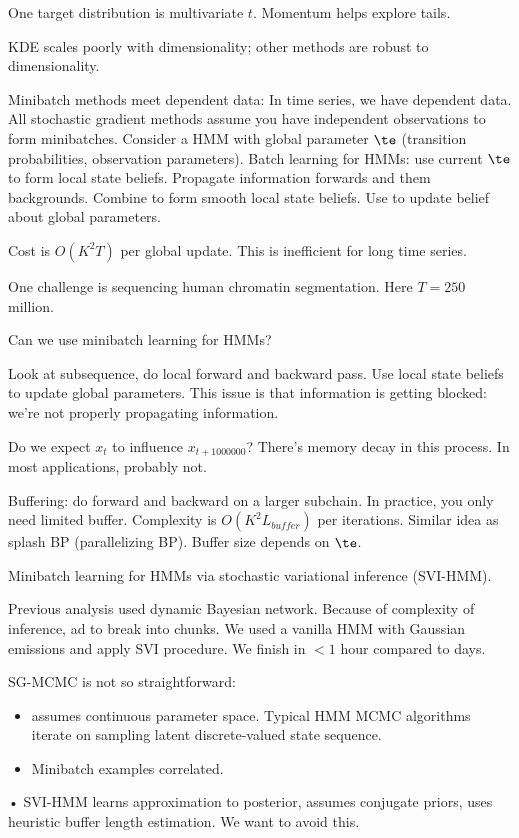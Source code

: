 One target distribution is multivariate $t$.
Momentum helps explore tails.

KDE scales poorly with dimensionality; other methods are robust to dimensionality.

Minibatch methods meet dependent data: In time series, we have dependent data. All stochastic gradient methods assume you have independent observations to form minibatches. 
Consider a HMM with global parameter $\te$ (transition probabilities, observation parameters). Batch learning for HMMs: use current $\te$ to form local state beliefs. Propagate information forwards and them backgrounds. Combine to form smooth local state beliefs. Use to update belief about global parameters.

Cost is $O(K^2T)$ per global update. 
This is inefficient for long time series.

One challenge is sequencing human chromatin segmentation. Here $T=250$ million.

Can we use minibatch learning for HMMs?

Look at subsequence, do local forward and backward pass. Use local state beliefs to update global parameters. This issue is that information is getting blocked: we're not properly propagating information.

Do we expect $x_t$ to influence $x_{t+1000000}$? There's memory decay in this process. In most applications, probably not. 

Buffering: do forward and backward on a larger subchain. 
In practice, you only need limited buffer. Complexity is $O(K^2L_{buffer})$ per iterations. Similar idea as splash BP (parallelizing BP). Buffer size depends on $\te$.

Minibatch learning for HMMs via stochastic variational inference (SVI-HMM).

Previous analysis used dynamic Bayesian network. Because of complexity of inference, ad to break into chunks. We used a vanilla HMM with Gaussian emissions and apply SVI procedure. We finish in $<1$ hour compared to days.

SG-MCMC is not so straightforward:
\begin{itemize}
\item
assumes continuous parameter space. Typical HMM MCMC algorithms iterate on sampling latent discrete-valued state sequence.
\item
Minibatch examples correlated.
\end{itemize}•
SVI-HMM learns approximation to posterior, assumes conjugate priors, uses heuristic buffer length estimation. We want to avoid this.

